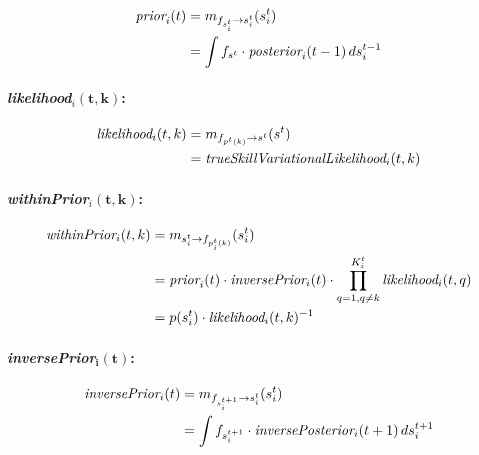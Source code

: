 \documentclass[article]{jss}
\begin{document}
 \begin{equation}
 \begin{split}
  \emph{prior}_i(t) &= m_{f_{s_i^t} \rightarrow s_i^t}(s_i^t) \\
  &= \int f_{s^t} \cdot \emph{posterior}_i(t-1) \, ds_i^{t-1}
  \end{split}
 \end{equation}

 \paragraph{\emph{likelihood}$_i\bm{(t,k)}$:}
 
 \begin{equation}
 \begin{split}
  \emph{likelihood}_i(t,k) &= m_{f_{p^{t}(k)} \rightarrow s^t}(s^t) \\
  &= \emph{trueSkillVariationalLikelihood}_i(t,k)
  \end{split}
 \end{equation}
 
 \paragraph{\emph{withinPrior}$_i\bm{(t,k)}$:}

 
 \begin{equation}
 \begin{split}
 \emph{withinPrior}_i(t,k) &= m_{s_i^t \rightarrow f_{p_i^t(k)}}(s_i^t)  \\
 &= \emph{prior}_i(t) \cdot \emph{inversePrior}_i(t) \cdot \prod_{q=1, q\neq k}^{K_i^t} \emph{likelihood}_i(t,q) \\
 &= p(s_i^t) \cdot \emph{likelihood}_i(t,k)^{-1}
  \end{split}
 \end{equation}
 
 \paragraph{\emph{inversePrior}$\bm{_i(t)}$: }
 
 \begin{equation}
 \begin{split}
 \emph{inversePrior}_i(t) &= m_{f_{s_i^{t+1}} \rightarrow s_i^t}(s_i^t) \\
 &= \int f_{s_i^{t+1}} \cdot \emph{inversePosterior}_i(t+1) \, ds_i^{t+1}
 \end{split}
 \end{equation}
  
\end{document}

